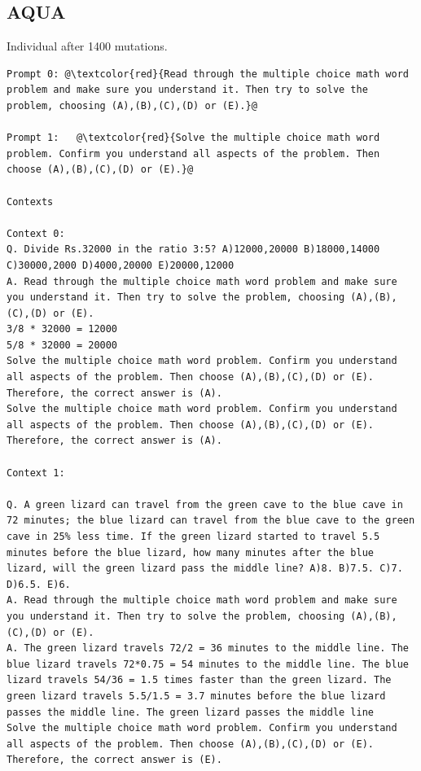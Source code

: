 \documentclass{article} %
\begin{document}
\subsection{AQUA}
Individual after 1400 mutations.

\begin{tcolorbox}
\begin{lstlisting}[escapechar=@]
Prompt 0: @\textcolor{red}{Read through the multiple choice math word problem and make sure you understand it. Then try to solve the problem, choosing (A),(B),(C),(D) or (E).}@

Prompt 1: 	@\textcolor{red}{Solve the multiple choice math word problem. Confirm you understand all aspects of the problem. Then choose (A),(B),(C),(D) or (E).}@

Contexts

Context 0:
Q. Divide Rs.32000 in the ratio 3:5? A)12000,20000 B)18000,14000 C)30000,2000 D)4000,20000 E)20000,12000
A. Read through the multiple choice math word problem and make sure you understand it. Then try to solve the problem, choosing (A),(B),(C),(D) or (E).
3/8 * 32000 = 12000
5/8 * 32000 = 20000
Solve the multiple choice math word problem. Confirm you understand all aspects of the problem. Then choose (A),(B),(C),(D) or (E).
Therefore, the correct answer is (A).
Solve the multiple choice math word problem. Confirm you understand all aspects of the problem. Then choose (A),(B),(C),(D) or (E).
Therefore, the correct answer is (A).

Context 1:

Q. A green lizard can travel from the green cave to the blue cave in 72 minutes; the blue lizard can travel from the blue cave to the green cave in 25% less time. If the green lizard started to travel 5.5 minutes before the blue lizard, how many minutes after the blue lizard, will the green lizard pass the middle line? A)8. B)7.5. C)7. D)6.5. E)6.
A. Read through the multiple choice math word problem and make sure you understand it. Then try to solve the problem, choosing (A),(B),(C),(D) or (E).
A. The green lizard travels 72/2 = 36 minutes to the middle line. The blue lizard travels 72*0.75 = 54 minutes to the middle line. The blue lizard travels 54/36 = 1.5 times faster than the green lizard. The green lizard travels 5.5/1.5 = 3.7 minutes before the blue lizard passes the middle line. The green lizard passes the middle line
Solve the multiple choice math word problem. Confirm you understand all aspects of the problem. Then choose (A),(B),(C),(D) or (E).
Therefore, the correct answer is (E).


\end{lstlisting}
\end{tcolorbox}
\end{document}
